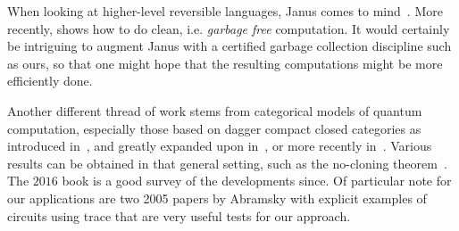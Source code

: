 \documentclass[sigplan,10pt,review,anonymous]{acmart}
\begin{document}
When looking at higher-level reversible languages, Janus
comes to mind~\cite{lutz1982janus}.  More recently, \cite{Yokoyama:2008:PRP}
shows how to do clean, i.e. \emph{garbage free} computation. It
would certainly be intriguing to augment Janus with a certified
garbage collection discipline such as ours, so that one might hope
that the resulting computations might be more efficiently done.

Another different thread of work stems from categorical models
of quantum computation, especially those based on dagger
compact closed categories as introduced
in~\cite{Abramsky:2004:CSQ:1018438.1021878}, and greatly
expanded upon
in~\cite{abramsky2009categorical,selinger2007dagger,Selinger:2011:FDH:1942319.1942398}, or more
recently in~\cite{DBLP:conf/lics/HuotS19}. Various
results can be obtained in that general setting, such as the
no-cloning theorem~\cite{abramsky2009no}. The $2016$ book
\cite{chiribella2016quantum} is a good survey of the
developments since. Of particular
note for our applications are two 2005 papers by Abramsky
\cite{abramsky2005structural,dblp:conf/calco/abramsky05}
with explicit examples of circuits using trace that are very useful tests
for our approach.





\end{document}
